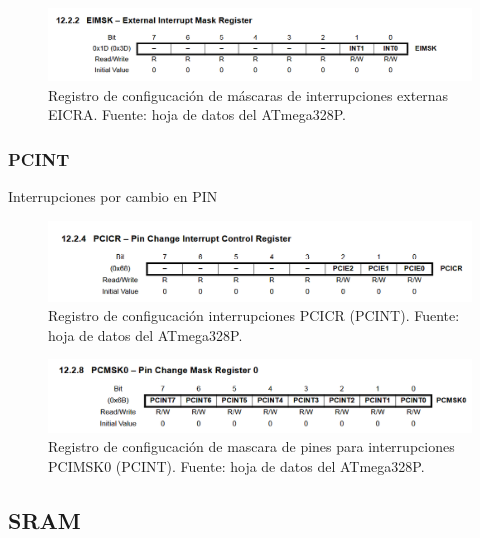     \begin{figure}[H]
    \centering
    \includegraphics[width=\linewidth]{./Anexos/Marco Teorico/External Interrupts/EIMSK.png}
    \caption{Registro de configucación de máscaras de interrupciones externas EICRA. Fuente: hoja de datos del ATmega328P\@\cite{atmega328p_datasheet}.}
    \label{fig:EIMSK}
    \end{figure}

    \subsubsection{PCINT}
    Interrupciones por cambio en PIN


    \begin{figure}[H]
    \centering
    \includegraphics[width=\linewidth]{./Anexos/Marco Teorico/External Interrupts/PCICR.png}
    \caption{Registro de configucación interrupciones PCICR (PCINT). Fuente: hoja de datos del ATmega328P\@\cite{atmega328p_datasheet}.}
    \label{fig:PCICR}
    \end{figure}

    \begin{figure}[H]
    \centering
    \includegraphics[width=\linewidth]{./Anexos/Marco Teorico/External Interrupts/PCMSK.png}
    \caption{Registro de configucación de mascara de pines para interrupciones PCIMSK0 (PCINT). Fuente: hoja de datos del ATmega328P\@\cite{atmega328p_datasheet}.}
    \label{fig:PCIMSK}
    \end{figure}

\subsection{SRAM}

